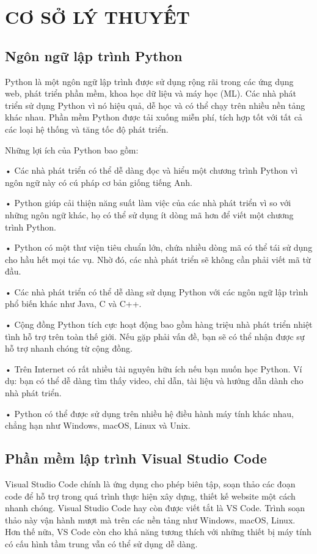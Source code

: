 \documentclass[a4paper]{article}
\begin{document}
\newpage
\section{CƠ SỞ LÝ THUYẾT}

	\subsection{Ngôn ngữ lập trình Python}

	Python là một ngôn ngữ lập trình được sử dụng rộng rãi trong các ứng dụng web, phát triển phần mềm, khoa học dữ liệu và máy học (ML). Các nhà phát triển sử dụng Python vì nó hiệu quả, dễ học và có thể chạy trên nhiều nền tảng khác nhau. Phần mềm Python được tải xuống miễn phí, tích hợp tốt với tất cả các loại hệ thống và tăng tốc độ phát triển.

	Những lợi ích của Python bao gồm:

	•	Các nhà phát triển có thể dễ dàng đọc và hiểu một chương trình Python vì ngôn ngữ này có cú pháp cơ bản giống tiếng Anh. 

	•	Python giúp cải thiện năng suất làm việc của các nhà phát triển vì so với những ngôn ngữ khác, họ có thể sử dụng ít dòng mã hơn để viết một chương trình Python.

	•	Python có một thư viện tiêu chuẩn lớn, chứa nhiều dòng mã có thể tái sử dụng cho hầu hết mọi tác vụ. Nhờ đó, các nhà phát triển sẽ không cần phải viết mã từ đầu.

	•	Các nhà phát triển có thể dễ dàng sử dụng Python với các ngôn ngữ lập trình phổ biến khác như Java, C và C++.

	•	Cộng đồng Python tích cực hoạt động bao gồm hàng triệu nhà phát triển nhiệt tình hỗ trợ trên toàn thế giới. Nếu gặp phải vấn đề, bạn sẽ có thể nhận được sự hỗ trợ nhanh chóng từ cộng đồng.

	•	Trên Internet có rất nhiều tài nguyên hữu ích nếu bạn muốn học Python. Ví dụ: bạn có thể dễ dàng tìm thấy video, chỉ dẫn, tài liệu và hướng dẫn dành cho nhà phát triển.

	•	Python có thể được sử dụng trên nhiều hệ điều hành máy tính khác nhau, chẳng hạn như Windows, macOS, Linux và Unix.

	\subsection{Phần mềm lập trình Visual Studio Code}
	
	Visual Studio Code chính là ứng dụng cho phép biên tập, soạn thảo các đoạn code để hỗ trợ trong quá trình thực hiện xây dựng, thiết kế website một cách nhanh chóng. Visual Studio Code hay còn được viết tắt là VS Code. Trình soạn thảo này vận hành mượt mà trên các nền tảng như Windows, macOS, Linux. Hơn thế nữa, VS Code còn cho khả năng tương thích với những thiết bị máy tính có cấu hình tầm trung vẫn có thể sử dụng dễ dàng.
\end{document}

